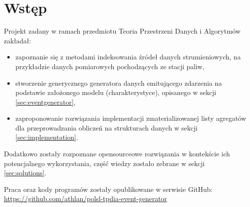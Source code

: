 \section{Wstęp}
\label{sec:intro}

Projekt zadany w ramach przedmiotu Teoria Przestrzeni Danych i Algorytmów zakładał:

\begin{itemize}[noitemsep]
  \item zapoznanie się z metodami indeksowania źródeł danych strumieniowych, na przykładzie danych pomiarowych pochodzących ze stacji paliw,
  \item stworzenie generycznego generatora danych emitującego zdarzenia na podstawie założonego modelu (charakterystyce), opisanego w sekcji \ref{sec:eventgenerator},
  \item zaproponowanie rozwiązania implementacji zmaterializowanej listy agregatów dla przeprowadzania obliczeń na strukturach danych w sekcji \ref{sec:implementation}.
\end{itemize}

Dodatkowo zostały rozpoznane opensourceowe rozwiązania w kontekście ich potencjalnego wykorzystania, część wiedzy zostało zebrane w sekcji \ref{sec:solutions}.

Praca oraz kody programów zostały opublikowane w serwisie GitHub:\\
\url{https://github.com/athlan/polsl-tpdia-event-generator}
